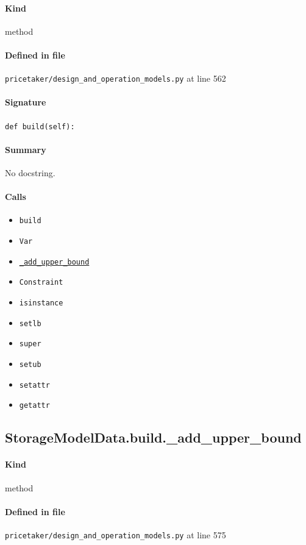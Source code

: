 \documentclass[11pt]{report}
\begin{document}
\paragraph{Kind} method
\paragraph{Defined in file} \texttt{pricetaker/design\_and\_operation\_models.py} at line 562
\paragraph{Signature} \texttt{def build(self):}
\paragraph{Summary} No docstring.
\paragraph{Calls}
\begin{itemize}[leftmargin=*]
  \item \texttt{build}
  \item \texttt{Var}
  \item \hyperref[def:pricetaker-design_and_operation_models.py:StorageModelData.build._add_upper_bound:L575]{\texttt{\_add\_upper\_bound}}
  \item \texttt{Constraint}
  \item \texttt{isinstance}
  \item \texttt{setlb}
  \item \texttt{super}
  \item \texttt{setub}
  \item \texttt{setattr}
  \item \texttt{getattr}
\end{itemize}
\subsection{StorageModelData.build.\_add\_upper\_bound}
\label{def:pricetaker-design_and_operation_models.py:StorageModelData.build._add_upper_bound:L575}
\paragraph{Kind} method
\paragraph{Defined in file} \texttt{pricetaker/design\_and\_operation\_models.py} at line 575
\end{document}
